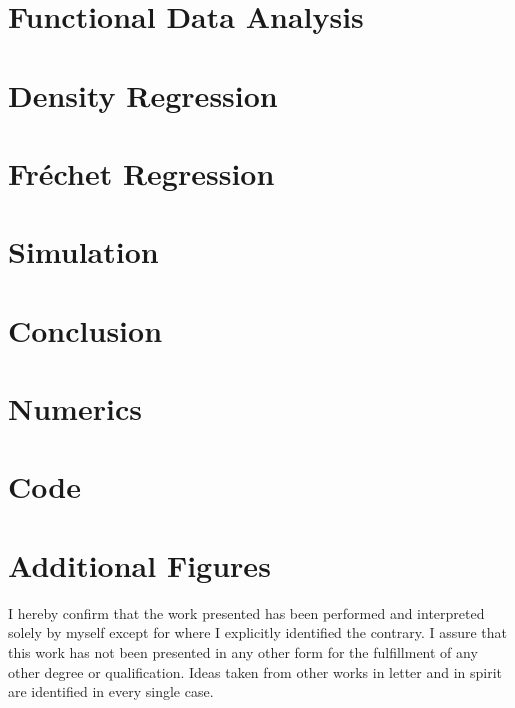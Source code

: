 \documentclass[12pt, a4paper, bibtotoc]{scrartcl}
\theoremstyle{break}
\begin{document}
\section{Functional Data Analysis}
\label{sec:fda}


\section{Density Regression}
\label{sec:density regression}


\section{Fréchet Regression}
\label{sec:fréchet regression}


\section{Simulation}
\label{sec:simulation}


\section{Conclusion}
\label{sec:conclusion}





\newpage
\appendix
{}

\section{Numerics}
\label{sec:numerics}


\section{Code}
\label{sec:code}

\section{Additional Figures}
\label{sec:figures}




\newpage

\nocite{Gaudecker2019}
\printbibliography

\newpage
\thispagestyle{empty}  %
\null\vfill            %
\begin{center}
I hereby confirm that the work presented has been performed and interpreted solely by
myself except for where I explicitly identified the contrary. I assure that this work has
not been presented in any other form for the fulfillment of any other degree or
qualification. Ideas taken from other works in letter and in spirit are identified
in every single case.
\end{center}
\end{document}
